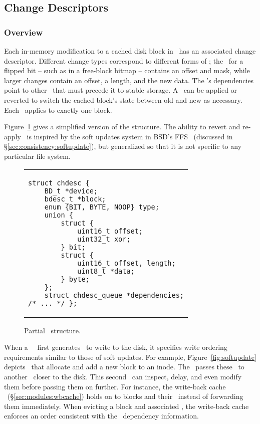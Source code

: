 \subsection {Change Descriptors}
\label{sec:design:chdescs}

\subsubsection {Overview}
Each in-memory modification to a cached disk block in \Kudos\ has an associated
change descriptor. Different change types correspond to different forms of
\chdescs; the \chdesc\ for a flipped bit -- such as in a free-block bitmap --
contains an offset and mask, while larger changes contain an offset, a length,
and the new data. The \chdesc's dependencies point to other \chdescs\ that must
precede it to stable storage. A \chdesc\ can be applied or reverted to switch
the cached block's state between old and new as necessary. Each \chdesc\ applies
to exactly one block.

Figure~\ref{fig:chdesc} gives a simplified version of the
structure. The ability to revert and re-apply \chdescs\ is inspired by
the soft updates system in BSD's FFS~\cite{ganger00soft} (discussed in
\S\ref{sec:consistency:softupdate}), but generalized so that it is not
specific to any particular file system.

\begin{figure}
\vskip-14pt
\begin{tabular}{@{\hskip0.58in}p{2in}@{}}
\begin{scriptsize}
\begin{verbatim}
struct chdesc {
    BD_t *device;
    bdesc_t *block;
    enum {BIT, BYTE, NOOP} type;
    union {
        struct {
            uint16_t offset;
            uint32_t xor;
        } bit;
        struct {
            uint16_t offset, length;
            uint8_t *data;
        } byte;
    };
    struct chdesc_queue *dependencies;
/* ... */ };
\end{verbatim}
\end{scriptsize}
\end{tabular}
\vspace{-10pt}
\caption{\label{fig:chdesc} Partial \chdesc\ structure.}
\end{figure}

When a \Kudos\ \module\ first generates \chdescs\ to write to the
disk, it specifies write ordering requirements similar to those of
soft updates. For example, Figure~\ref{fig:softupdate} depicts
\chdescs\ that allocate and add a new block to an inode. The \module\
passes these \chdescs\ to another \module\ closer to the disk. This
second \module\ can inspect, delay, and even modify them before
passing them on further. For instance, the write-back cache \module\
(\S\ref{sec:modules:wbcache}) holds on to blocks and their \chdescs\
instead of forwarding them immediately. When evicting a block and
associated \chdescs, the write-back cache enforces an order consistent
with the \chdesc\ dependency information.

